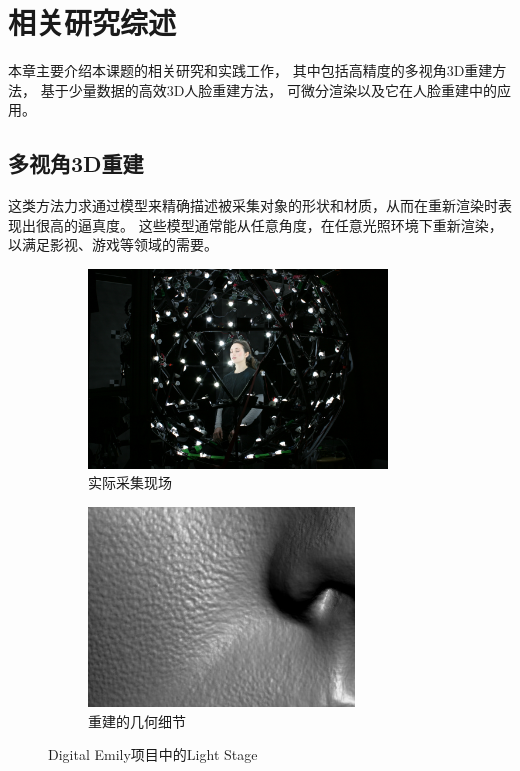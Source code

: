 \chapter{相关研究综述}
\label{chap:related_work}

本章主要介绍本课题的相关研究和实践工作，
其中包括高精度的多视角3D重建方法，
基于少量数据的高效3D人脸重建方法，
可微分渲染以及它在人脸重建中的应用。

\section{多视角3D重建}

这类方法力求通过模型来精确描述被采集对象的形状和材质，从而在重新渲染时表现出很高的逼真度。
这些模型通常能从任意角度，在任意光照环境下重新渲染，以满足影视、游戏等领域的需要。

\begin{figure}
\centering
\begin{subfigure}[b]{0.5\textwidth}
    \centering
    \includegraphics[height=150pt]{figures/light_stage}
    \caption{实际采集现场}
\end{subfigure}
\begin{subfigure}[b]{0.45\textwidth}
    \centering
    \includegraphics[height=150pt]{figures/emily_detail_1.png}
    \caption{重建的几何细节}
\end{subfigure}
\caption{Digital Emily项目中的Light Stage\cite{DEP}}
\end{figure}

